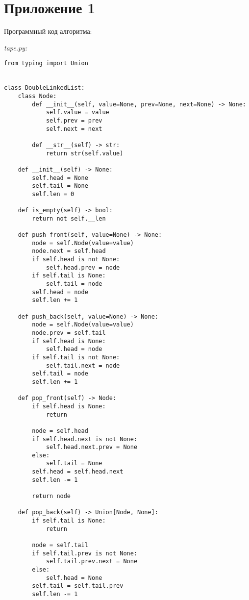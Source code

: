 \section*{Приложение 1} \label{application1}
\pagestyle{empty}

\setcounter{figure}{0}

Программный код алгоритма:

\textit{tape.py:}

\begin{lstlisting}
from typing import Union


class DoubleLinkedList:
    class Node:
        def __init__(self, value=None, prev=None, next=None) -> None:
            self.value = value
            self.prev = prev
            self.next = next

        def __str__(self) -> str:
            return str(self.value)

    def __init__(self) -> None:
        self.head = None
        self.tail = None
        self.len = 0

    def is_empty(self) -> bool:
        return not self.__len

    def push_front(self, value=None) -> None:
        node = self.Node(value=value)
        node.next = self.head
        if self.head is not None:
            self.head.prev = node
        if self.tail is None:
            self.tail = node
        self.head = node
        self.len += 1

    def push_back(self, value=None) -> None:
        node = self.Node(value=value)
        node.prev = self.tail
        if self.head is None:
            self.head = node
        if self.tail is not None:
            self.tail.next = node
        self.tail = node
        self.len += 1

    def pop_front(self) -> Node:
        if self.head is None:
            return

        node = self.head
        if self.head.next is not None:
            self.head.next.prev = None
        else:
            self.tail = None
        self.head = self.head.next
        self.len -= 1

        return node

    def pop_back(self) -> Union[Node, None]:
        if self.tail is None:
            return

        node = self.tail
        if self.tail.prev is not None:
            self.tail.prev.next = None
        else:
            self.head = None
        self.tail = self.tail.prev
        self.len -= 1


\end{lstlisting}
